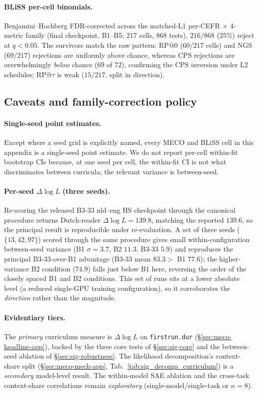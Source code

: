 \paragraph{BLiSS per-cell binomials.} Benjamini--Hochberg FDR-corrected across the matched-L1 per-CEFR $\times$ 4-metric family (final checkpoint, B1--B5; $217$ cells, $868$ tests), $216/868$ ($25\%$) reject at $q<0.05$. The survivors match the raw pattern: RP$@0$ ($60/217$ cells) and NGS ($69/217$) rejections are uniformly above chance, whereas CPS rejections are overwhelmingly \emph{below} chance ($69$ of $72$), confirming the CPS inversion under L2 schedules; RP$@\tau$ is weak ($15/217$, split in direction).
 
\subsection{Caveats and family-correction policy}\label{sec:sig-uncertainty}
 
\paragraph{Single-seed point estimates.} Except where a seed grid is explicitly named, every MECO and BLiSS cell in this appendix is a single-seed point estimate. We do not report per-cell within-fit bootstrap CIs because, at one seed per cell, the within-fit CI is not what discriminates between curricula; the relevant variance is between-seed.
 
\paragraph{Per-seed $\Delta\log L$ (three seeds).} Re-scoring the released B3-33 nld--eng HS checkpoint through the canonical procedure returns Dutch-reader $\Delta\log L = 139.8$, matching the reported $139.6$, so the principal result is reproducible under re-evaluation. A set of three seeds ($\{13,42,97\}$) scored through the same procedure gives small within-configuration between-seed variance (B1 $\sigma{=}3.7$, B2 $11.3$, B3-33 $5.9$) and reproduces the principal B3-33-over-B1 advantage (B3-33 mean $83.3 >$ B1 $77.6$); the higher-variance B2 condition ($74.9$) falls just below B1 here, reversing the order of the closely spaced B1 and B2 conditions. This set of runs sits at a lower absolute level (a reduced single-GPU training configuration), so it corroborates the \emph{direction} rather than the magnitude.
 
\paragraph{Evidentiary tiers.} The \emph{primary} curriculum measure is $\Delta\log L$ on \texttt{firstrun.dur} (\S\ref{sec:meco-headline-app}), backed by the three core tests of \S\ref{sec:sig-core} and the between-seed ablation of \S\ref{sec:sig-robustness}. The likelihood decomposition's context-share split (\S\ref{sec:meco-mech-app}, Tab.~\ref{tab:sig_decomp_curriculum}) is a \emph{secondary} model-level result. The within-model SAE ablation and the cross-task context-share correlations remain \emph{exploratory} (single-model/single-task or $n{=}8$).
 

